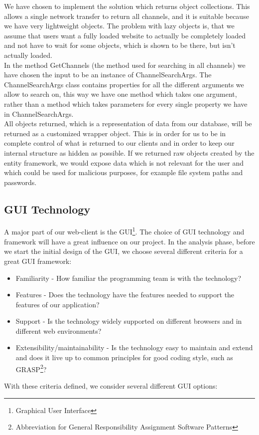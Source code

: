 \documentclass[a4paper,11pt,report]{article}
\begin{document}
We have chosen to implement the solution which returns object collections. This allows a single network transfer to return all channels, and it is suitable because we have very lightweight objects. The problem with lazy objects is, that we assume that users want a fully loaded website to actually be completely loaded and not have to wait for some objects, which is shown to be there, but isn't actually loaded. \\
In the method GetChannels (the method used for searching in all channels) we have chosen the input to be an instance of ChannelSearchArgs. The ChannelSearchArgs class contains properties for all the different arguments we allow to search on, this way we have one method which takes one argument, rather than a method which takes parameters for every single property we have in ChannelSearchArgs. \\
All objects returned, which is a representation of data from our database, will be returned as a customized wrapper object. This is in order for us to be in complete control of what is returned to our clients and in order to keep our internal structure as hidden as possible. If we returned raw objects created by the entity framework, we would expose data which is not relevant for the user and which could be used for malicious purposes, for example file system paths and passwords.

\subsection{GUI Technology}
A major part of our web-client is the GUI\footnote{Graphical User Interface}. The choice of GUI technology and framework will have a great influence on our project. In the analysis phase, before we start the initial design of the GUI, we choose several different criteria for a great GUI framework:
\begin{itemize}
\item Familiarity - How familiar the programming team is with the technology?
\item Features - Does the technology have the features needed to support the features of our application?
\item Support - Is the technology widely supported on different browsers and in different web environments?
\item Extensibility/maintainability - Is the technology easy to maintain and extend and does it live up to common principles for good coding style, such as GRASP\footnote{Abbreviation for General Responsibility Assignment Software Patterns}?
\end{itemize}
With these criteria defined, we consider several different GUI options: \\
\end{document}
